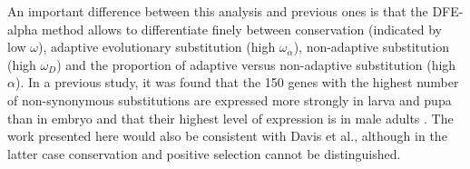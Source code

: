 An important difference between this analysis and previous ones is that the DFE-alpha method allows to differentiate finely between conservation (indicated by low $\omega$), adaptive evolutionary substitution (high $\omega_{\alpha}$), non-adaptive substitution (high $\omega_{D}$) and the proportion of adaptive versus non-adaptive substitution (high $\alpha$). 
In a previous study, it was found that the 150 genes with the highest number of non-synonymous substitutions are expressed more strongly in larva and pupa than in embryo and that their highest level of expression is in male adults \citep{Davis2005}.
The work presented here would also be consistent with Davis et al., although in the latter case conservation and positive selection cannot be distinguished.
